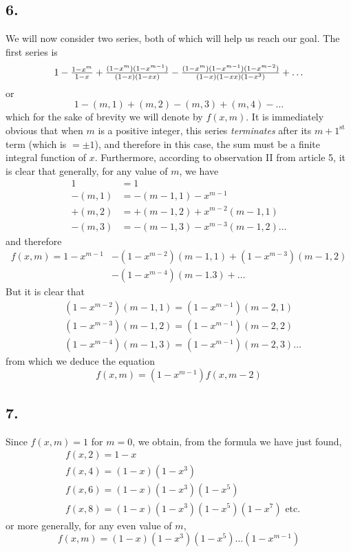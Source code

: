 \documentclass[twoside,12pt]{memoir}
\let\oldfrac\frac
\def\frac#1#2{\mathchoice{\tfrac{#1}{#2}}{\oldfrac{#1}{#2}}{\genfrac{}{}{}{2}{#1}{#2\mathstrut}}{\genfrac{}{}{}{3}{#1}{#2\mathstrut}}}
\begin{document}
\subsection*{6.}

We will now consider two series, both of which will help us reach our goal. The first series is\pagebreak%
\[1-\frac{1-x^{m}}{1-x}+\frac{(1-x^{m})(1-x^{m-1})}{(1-x)(1-xx)}-\frac{(1-x^{m})(1-x^{m-1})(1-x^{m-2})}{(1-x)(1-xx)(1-x^{3})}+\ldots\]
or
\[1-(m, 1)+(m, 2)-(m, 3)+(m, 4)-\ldots\]
which for the sake of brevity we will denote by \(f(x, m)\). It is immediately obvious that when \(m\) is a positive integer, this series \textit{terminates} after its \({m+1}^{\text{st }}\) term (which is \(= \pm 1\)), and therefore in this case, the sum must be a finite integral function of \(x\). Furthermore, according to observation II from article 5, it is clear that generally, for any value of \(m\), we have
\[\begin{aligned}
1 & =1 \\
-(m, 1) & =-(m-1,1)-x^{m-1} \\
+(m, 2) & =+(m-1,2)+x^{m-2}(m-1,1) \\
-(m, 3) & =-(m-1,3)-x^{m-3}(m-1,2) \ldots
\end{aligned}\]
and therefore
\[\begin{aligned}
f(x, m)=1-x^{m-1}&-(1-x^{m-2})(m-1,1)+(1-x^{m-3})(m-1,2) \\
&-(1-x^{m-4})(m-1.3)+\ldots
\end{aligned}\]
But it is clear that
\[\begin{aligned}
& (1-x^{m-2})(m-1,1)=(1-x^{m-1})(m-2,1) \\
& (1-x^{m-3})(m-1,2)=(1-x^{m-1})(m-2,2) \\
& (1-x^{m-4})(m-1,3)=(1-x^{m-1})(m-2,3) \ldots
\end{aligned}\]
from which we deduce the equation
\[f(x, m)=(1-x^{m-1}) f(x, m-2) \tag{1}\]

\subsection*{7.}
 
Since \(f(x, m)=1\) for \(m=0\), we obtain, from the formula we have just found,
\[\begin{aligned}
& f(x, 2)=1-x \\
& f(x, 4)=(1-x)(1-x^{3}) \\
& f(x, 6)=(1-x)(1-x^{3})(1-x^{5}) \\
& f(x, 8)=(1-x)(1-x^{3})(1-x^{5})(1-x^{7}) \text{ etc{.}}
\end{aligned}\]
or more generally, for any even value of \(m\),
\[f(x, m)=(1-x)(1-x^{3})(1-x^{5}) \ldots (1-x^{m-1}) \tag{2}\]\pagebreak%
\end{document}
